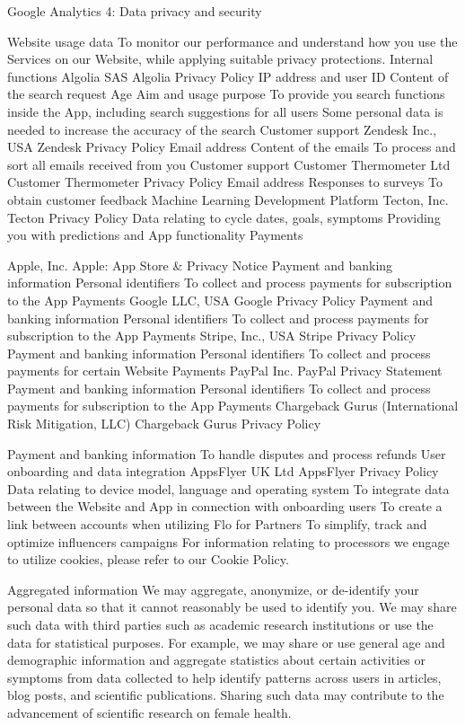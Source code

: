 Google Analytics 4: Data privacy and security

Website usage data
To monitor our performance and understand how you use the Services on our Website, while applying suitable privacy protections. 
Internal functions
Algolia SAS
Algolia Privacy Policy
IP address and user ID
Content of the search request
Age
Aim and usage purpose
To provide you search functions inside the App, including search suggestions for all users
Some personal data is needed to increase the accuracy of the search
Customer support
Zendesk Inc., USA
Zendesk Privacy Policy
Email address
Content of the emails
To process and sort all emails received from you
Customer support
Customer Thermometer Ltd 
Customer Thermometer Privacy Policy
Email address
Responses to surveys
To obtain customer feedback
Machine Learning Development Platform
Tecton, Inc.
Tecton Privacy Policy
Data relating to cycle dates, goals, symptoms
Providing you with predictions and App functionality
Payments
 
Apple, Inc.
Apple: App Store & Privacy Notice
Payment and banking information
Personal identifiers
To collect and process payments for subscription to the App
Payments
Google LLC, USA
Google Privacy Policy
Payment and banking information
Personal identifiers
To collect and process payments for subscription to the App
Payments
Stripe, Inc., USA
Stripe Privacy Policy
Payment and banking information
Personal identifiers
To collect and process payments for certain Website 
Payments
PayPal Inc.
PayPal Privacy Statement
Payment and banking information
Personal identifiers
To collect and process payments for subscription to the App
Payments
Chargeback Gurus (International Risk Mitigation, LLC)
Chargeback Gurus Privacy Policy
 
Payment and banking information
To handle disputes and process refunds 
User onboarding and data integration
AppsFlyer UK Ltd 
AppsFlyer Privacy Policy
Data relating to device model, language and operating system
To integrate data between the Website and App in connection with onboarding users
To create a link between accounts when utilizing Flo for Partners
To simplify, track and optimize influencers campaigns
For information relating to processors we engage to utilize cookies, please refer to our Cookie Policy. 

Aggregated information
We may aggregate, anonymize, or de-identify your personal data so that it cannot reasonably be used to identify you. We may share such data with third parties such as academic research institutions or use the data for statistical purposes. For example, we may share or use general age and demographic information and aggregate statistics about certain activities or symptoms from data collected to help identify patterns across users in articles, blog posts, and scientific publications. Sharing such data may contribute to the advancement of scientific research on female health. 

